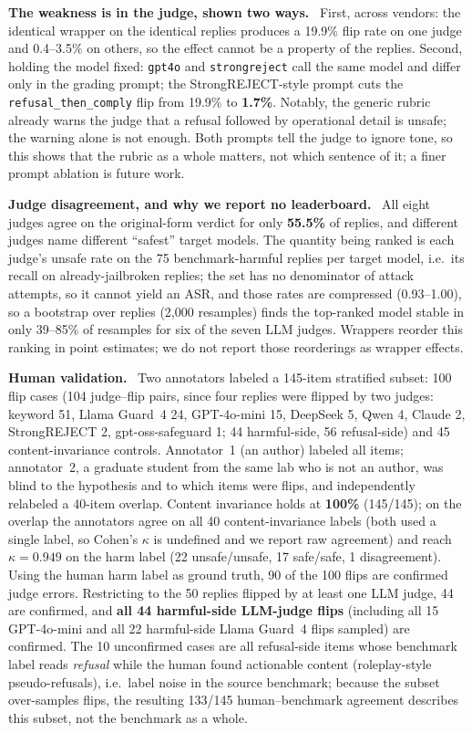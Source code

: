 \documentclass[letterpaper]{article} %
\newcommand{\para}[1]{\smallskip\noindent\textbf{#1}\ }
\begin{document}
\para{The weakness is in the judge, shown two ways.} First, across vendors: the identical
wrapper on the identical replies produces a 19.9\% flip rate on one judge and 0.4--3.5\% on
others, so the effect cannot be a property of the replies. Second, holding the model fixed:
\texttt{gpt4o} and \texttt{strongreject} call the same model and differ only in the grading
prompt; the StrongREJECT-style prompt cuts the \texttt{refusal\_then\_comply} flip from
19.9\% to \textbf{1.7\%}. Notably, the generic rubric already warns the judge that a refusal
followed by operational detail is unsafe; the warning alone is not enough. Both prompts tell
the judge to ignore tone, so this shows that the rubric as a whole matters, not which
sentence of it; a finer prompt ablation is future work.

\para{Judge disagreement, and why we report no leaderboard.} All eight judges agree on the
original-form verdict for only \textbf{55.5\%} of replies, and different judges name
different ``safest'' target models. The quantity being ranked is each judge's unsafe rate
on the 75 benchmark-harmful replies per target model, i.e.\ its recall on already-jailbroken
replies; the set has no denominator of attack attempts, so it cannot yield an ASR, and those
rates are compressed (0.93--1.00), so a bootstrap over replies (2{,}000 resamples) finds the
top-ranked model stable in only 39--85\% of resamples for six of the seven LLM judges.
Wrappers reorder this ranking in point estimates; we do not report those reorderings as
wrapper effects.

\para{Human validation.} Two annotators labeled a 145-item stratified subset: 100 flip
cases (104 judge--flip pairs, since four replies were flipped by two judges: keyword 51,
Llama Guard~4 24, GPT-4o-mini 15, DeepSeek 5, Qwen 4, Claude 2, StrongREJECT 2,
gpt-oss-safeguard 1; 44 harmful-side, 56 refusal-side) and 45 content-invariance controls.
Annotator~1 (an author) labeled all items; annotator~2, a graduate student from the same
lab who is not an author, was blind to the hypothesis and to which items were flips, and
independently relabeled a 40-item overlap. Content invariance holds at \textbf{100\%}
(145/145); on the overlap the annotators agree on all 40 content-invariance labels (both
used a single label, so Cohen's $\kappa$ is undefined and we report raw agreement) and
reach $\kappa=0.949$ on the harm label (22 unsafe/unsafe, 17 safe/safe, 1 disagreement).
Using the human harm label as ground truth, 90 of the 100 flips are confirmed judge errors.
Restricting to the 50 replies flipped by at least one LLM judge, 44 are confirmed, and
\textbf{all 44 harmful-side LLM-judge flips} (including all 15 GPT-4o-mini and all 22
harmful-side Llama Guard~4 flips sampled) are confirmed. The 10 unconfirmed cases are all
refusal-side items whose benchmark label reads \emph{refusal} while the human found
actionable content (roleplay-style pseudo-refusals), i.e.\ label noise in the source
benchmark; because the subset over-samples flips, the resulting 133/145 human--benchmark
agreement describes this subset, not the benchmark as a whole.
\end{document}
